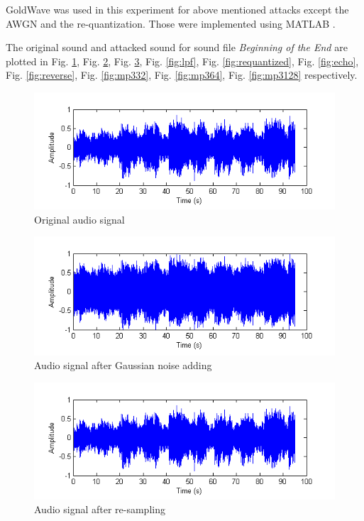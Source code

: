 \documentclass[12pt,a4paper]{report}
\begin{document}
GoldWave \cite{goldwave} was used in this experiment for above mentioned attacks except  the AWGN and the re-quantization. Those were implemented using MATLAB \cite{matlab}.

\bigskip

The original sound and attacked sound for sound file \textit{Beginning of the End} are plotted in Fig. \ref{fig:original}, Fig. \ref{fig:noise}, Fig. \ref{fig:resampling}, Fig. \ref{fig:lpf}, Fig. \ref{fig:requantized}, Fig. \ref{fig:echo}, Fig. \ref{fig:reverse}, Fig. \ref{fig:mp332}, Fig. \ref{fig:mp364}, Fig. \ref{fig:mp3128} respectively.

\begin{figure}[h!]
\centering
\includegraphics[scale=0.8]{image/original}
\caption{Original audio signal}
\label{fig:original}
\end{figure}

\begin{figure}[h!]
\centering
\includegraphics[scale=0.8]{image/awgn.png}
\caption{Audio signal after Gaussian noise adding}
\label{fig:noise}
\end{figure}

\newpage

\begin{figure}[h!]
\centering
\includegraphics[scale=0.8]{image/resampling.png}
\caption{Audio signal after re-sampling}
\label{fig:resampling}
\end{figure}
\end{document}
